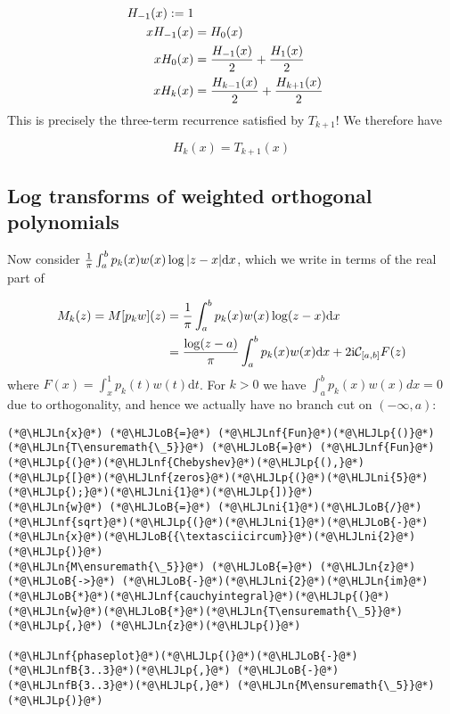 \documentclass[12pt,landscape]{article}
\newcommand{\HLJLn}[1]{#1}
\newcommand{\HLJLnf}[1]{\textcolor[RGB]{66,102,213}{#1}}
\newcommand{\HLJLnfB}[1]{\textcolor[RGB]{59,151,46}{#1}}
\newcommand{\HLJLni}[1]{\textcolor[RGB]{59,151,46}{#1}}
\newcommand{\HLJLoB}[1]{\textcolor[RGB]{102,102,102}{\textbf{#1}}}
\newcommand{\HLJLp}[1]{#1}
\def\D{ {\rm d} }
\def\I{ {\rm i} }
\def\CC{ {\cal C} }
\def\dx{\D x}
\begin{document}
{\begin{align*}
H_{-1}(x) := 1 \\
 xH_{-1}(x)  &= H_0(x) \\
x H_0(x) &= {H_{-1}(x) \over 2} + {H_1(x) \over 2} \\
x H_k(x) &= {H_{k-1}(x) \over 2} + {H_{k+1}(x) \over 2}
\end{align*}
This is precisely the three-term recurrence satisfied by $T_{k+1}$! We therefore have

\[
H_k(x) = T_{k+1}(x)
\]
\subsection{Log transforms of weighted orthogonal polynomials}
Now consider ${1 \over \pi} \int_a^b p_k(x) w(x) \log |z-x| \dx$, which we write in terms of the real part of

\begin{align*}
M_k(z) = M[p_k w](z)& = {1 \over \pi } \int_a^b p_k(x) w(x) \log (z-x) \dx \\
&= {\log(z-a) \over \pi}\int_{a}^{b}p_k(x) w(x)\mathrm{d}x + 2\I \CC_{[a,b]}F(z)
\end{align*}
where $F(x) = \int_{x}^{1} p_k(t) w(t) \mathrm{d}t$. For $k > 0$ we have $\int_a^b p_k(x) w(x) dx = 0$ due to orthogonality, and hence we actually have no branch cut on $(-\infty, a)$:


\begin{lstlisting}
(*@\HLJLn{x}@*) (*@\HLJLoB{=}@*) (*@\HLJLnf{Fun}@*)(*@\HLJLp{()}@*)
(*@\HLJLn{T\ensuremath{\_5}}@*) (*@\HLJLoB{=}@*) (*@\HLJLnf{Fun}@*)(*@\HLJLp{(}@*)(*@\HLJLnf{Chebyshev}@*)(*@\HLJLp{(),}@*) (*@\HLJLp{[}@*)(*@\HLJLnf{zeros}@*)(*@\HLJLp{(}@*)(*@\HLJLni{5}@*)(*@\HLJLp{);}@*)(*@\HLJLni{1}@*)(*@\HLJLp{])}@*)
(*@\HLJLn{w}@*) (*@\HLJLoB{=}@*) (*@\HLJLni{1}@*)(*@\HLJLoB{/}@*)(*@\HLJLnf{sqrt}@*)(*@\HLJLp{(}@*)(*@\HLJLni{1}@*)(*@\HLJLoB{-}@*)(*@\HLJLn{x}@*)(*@\HLJLoB{{\textasciicircum}}@*)(*@\HLJLni{2}@*)(*@\HLJLp{)}@*)
(*@\HLJLn{M\ensuremath{\_5}}@*) (*@\HLJLoB{=}@*) (*@\HLJLn{z}@*)(*@\HLJLoB{->}@*) (*@\HLJLoB{-}@*)(*@\HLJLni{2}@*)(*@\HLJLn{im}@*)(*@\HLJLoB{*}@*)(*@\HLJLnf{cauchyintegral}@*)(*@\HLJLp{(}@*)(*@\HLJLn{w}@*)(*@\HLJLoB{*}@*)(*@\HLJLn{T\ensuremath{\_5}}@*)(*@\HLJLp{,}@*) (*@\HLJLn{z}@*)(*@\HLJLp{)}@*)

(*@\HLJLnf{phaseplot}@*)(*@\HLJLp{(}@*)(*@\HLJLoB{-}@*)(*@\HLJLnfB{3..3}@*)(*@\HLJLp{,}@*) (*@\HLJLoB{-}@*)(*@\HLJLnfB{3..3}@*)(*@\HLJLp{,}@*) (*@\HLJLn{M\ensuremath{\_5}}@*)(*@\HLJLp{)}@*)
\end{lstlisting}

}
\end{document}
